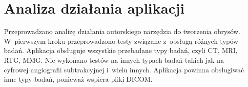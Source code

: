 \documentclass[a4paper,11pt,twoside,openright]{report}
\theoremstyle{definition}
\begin{document}




\section {Analiza działania aplikacji}



Przeprowadzano analizę działania autorskiego narzędzia do tworzenia obrysów.
W~pierwszym kroku przeprowadzono testy związane z~obsługą różnych typów badań.
Aplikacja obsługuje wszystkie przebadane typy badań, czyli CT, MRI, RTG, MMG.
Nie wykonano testów na innych typach badań takich jak na cyfrowej angiografii subtrakcyjnej
i~wielu innych. Aplikacja powinna obsługiwać inne typy badań, ponieważ wspiera pliki DICOM.
\end{document}
